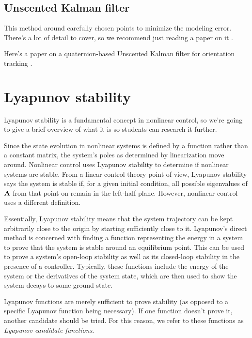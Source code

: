 \subsection{Unscented Kalman filter}

This method  around carefully chosen points
to minimize the modeling error. There's a lot of detail to cover, so we
recommend just reading a paper on it \cite{bib:unscented_kalman_filter}.

Here's a paper on a quaternion-based Unscented Kalman filter for orientation
tracking \cite{bib:ukf_state_tracking}.

\section{Lyapunov stability}

Lyapunov stability is a fundamental concept in nonlinear control, so we're going
to give a brief overview of what it is so students can research it further.

Since the \gls{state} evolution in nonlinear \glspl{system} is defined by a
function rather than a constant matrix, the \gls{system}'s poles as determined
by \gls{linearization} move around. Nonlinear control uses Lyapunov stability to
determine if nonlinear \glspl{system} are stable. From a linear control theory
point of view, Lyapunov stability says the \gls{system} is stable if, for a
given initial condition, all possible eigenvalues of $\mathbf{A}$ from that point
on remain in the left-half plane. However, nonlinear control uses a different
definition.

Essentially, Lyapunov stability means that the \gls{system} trajectory can be
kept arbitrarily close to the origin by starting sufficiently close to it.
Lyapunov's direct method is concerned with finding a function representing the
energy in a \gls{system} to prove that the \gls{system} is stable around an
equilibrium point. This can be used to prove a \gls{system}'s open-loop
stability as well as its closed-loop stability in the presence of a controller.
Typically, these functions include the energy of the \gls{system} or the
derivatives of the \gls{system} \gls{state}, which are then used to show the
\gls{system} decays to some ground state.

Lyapunov functions are merely sufficient to prove stability (as opposed to a
specific Lyapunov function being necessary). If one function doesn't prove it,
another candidate should be tried. For this reason, we refer to these functions
as \textit{Lyapunov candidate functions}.

